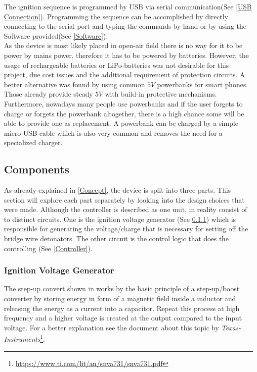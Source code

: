 \noindent The ignition sequence is programmed by USB via serial communication(See \cref{USB Connection}). Programming the sequence can be accomplished by directly connecting to the serial port and typing the commands by hand or by using the Software provided(See \cref{Software}).\\

\noindent As the device is most likely placed in open-air field there is no way for it to be power by mains power, therefore it has to be powered by batteries. However, the usage of rechargeable batteries or LiPo-batteries was not desirable for this project, due cost issues and the additional requirement of protection circuits. A better alternative was found by using common $5V$ powerbanks for smart phones. Those already provide steady $5V$ with build-in protective mechanisms. Furthermore, nowadays many people use powerbanks and if the user forgets to charge or forgets the powerbank altogether, there is a high chance some will be able to provide one as replacement. A powerbank can be charged by a simple micro USB cable which is also very common and removes the need for a specialized charger.





\pagebreak

\subsection{Components}
As already explained in \cref{Concept}, the device is split into three parts. This section will explore each part separately by looking into the design choices that were made. Although the controller is described as one unit, in reality consist  of to distinct circuits. One is the ignition voltage generator (See \cref{Ignition Voltage Generator}) which is responsible for generating the voltage/charge that is necessary for setting off the bridge wire detonators. The other circuit is the control logic that does the controlling (See \cref{Controller}).


\subsubsection{Ignition Voltage Generator}
\label{Ignition Voltage Generator}



\noindent The step-up convert shown in  works by the basic principle of a step-up/boost converter by storing energy in form of a magnetic field inside a inductor and releasing the energy as a current into a capacitor. Repeat this process at high frequency and a higher voltage is created at the output compared to the input voltage. For a better explanation see the document about this topic by \textit{Texas-Instruments}\footnote{\url{https://www.ti.com/lit/an/snva731/snva731.pdf}}.


